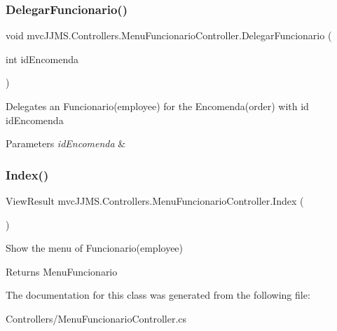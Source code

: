 \subsubsection{\texorpdfstring{Delegar\+Funcionario()}{DelegarFuncionario()}}
{\footnotesize\ttfamily void mvc\+J\+J\+M\+S.\+Controllers.\+Menu\+Funcionario\+Controller.\+Delegar\+Funcionario (\begin{DoxyParamCaption}\item[{int}]{id\+Encomenda }\end{DoxyParamCaption})\hspace{0.3cm}{\ttfamily [inline]}}



Delegates an Funcionario(employee) for the Encomenda(order) with id id\+Encomenda 


\begin{DoxyParams}{Parameters}
{\em id\+Encomenda} & \\
\hline
\end{DoxyParams}
\mbox{\label{classmvc_j_j_m_s_1_1_controllers_1_1_menu_funcionario_controller_acdc18ba7b60c90728254ff66cf523c10}} 
\subsubsection{\texorpdfstring{Index()}{Index()}}
{\footnotesize\ttfamily View\+Result mvc\+J\+J\+M\+S.\+Controllers.\+Menu\+Funcionario\+Controller.\+Index (\begin{DoxyParamCaption}{ }\end{DoxyParamCaption})\hspace{0.3cm}{\ttfamily [inline]}}



Show the menu of Funcionario(employee) 

\begin{DoxyReturn}{Returns}
Menu\+Funcionario
\end{DoxyReturn}


The documentation for this class was generated from the following file\+:\begin{DoxyCompactItemize}
\item 
Controllers/Menu\+Funcionario\+Controller.\+cs\end{DoxyCompactItemize}
